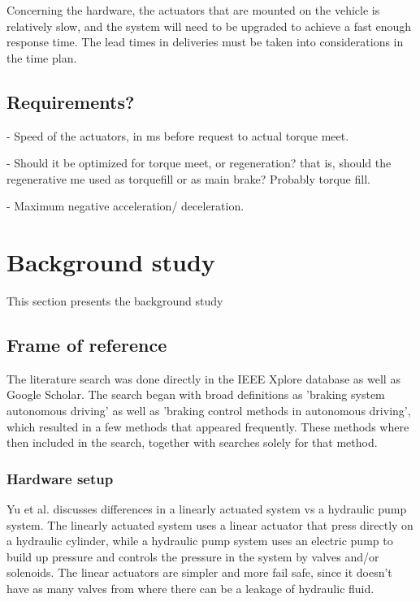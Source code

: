 \documentclass[a4paper,11pt]{kth-mag}
\begin{document}
Concerning the hardware, the actuators that are mounted on the vehicle is relatively slow, and the system will need to be upgraded to achieve a fast enough response time. The lead times in deliveries must be taken into considerations in the time plan.

\section{Requirements?}

- Speed of the actuators, in ms before request to actual torque meet.

- Should it be optimized for torque meet, or regeneration? that is, should the regenerative me used as torquefill or as main brake? Probably torque fill.

- Maximum negative acceleration/ deceleration.


\chapter{Background study}
This section presents the background study
\section*{Frame of reference}
The literature search was done directly in the IEEE Xplore database as well as Google Scholar. The search began with broad definitions as 'braking system autonomous driving' as well as 'braking control methods in autonomous driving', which resulted in a few methods that appeared frequently. These methods where then included in the search, together with searches solely for that method.


\subsection*{Hardware setup}
Yu et al. \cite{Yu} discusses differences in a linearly actuated system vs a hydraulic pump system. The linearly actuated system uses a linear actuator that press directly on a hydraulic cylinder, while a hydraulic pump system uses an electric pump to build up pressure and controls the pressure in the system by valves and/or solenoids. The linear actuators are simpler and more fail safe, since it doesn't have as many valves from where there can be a leakage of hydraulic fluid. 
\end{document}
